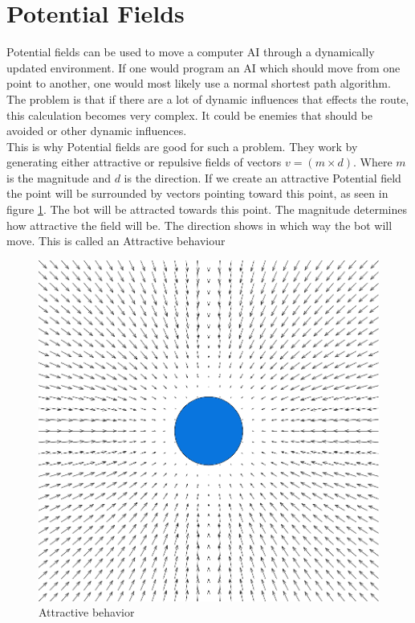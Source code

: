 \section{Potential Fields}
	Potential fields can be used to move a computer AI through a dynamically updated environment. 
	If one would program an AI which should move from one point to another, one would most likely use a normal shortest path algorithm. 
	The problem is that if there are a lot of dynamic influences that effects the route, this calculation becomes very complex. It could be 
	enemies that should be avoided or other dynamic influences. \\
	
	This is why Potential fields are good for such a problem. They work by generating either attractive or repulsive fields of vectors $v=(m \times d)$. 
	Where $m$ is the magnitude and $d$ is the direction. 
	If we create an attractive Potential field the point will be surrounded by vectors pointing toward this point, 
	as seen in figure \ref{fig:seekbehavior}. 
	The bot will be attracted towards this point. The magnitude determines how attractive the field will be. The direction shows in which way the bot will move. This is called an Attractive behaviour 
		
	\begin{figure}[H]
		\begin{center}
			\includegraphics[scale=0.3]{Figures/Potentialfields/seek.png}
			\caption{Attractive behavior\cite{pft}}\label{fig:seekbehavior}
		\end{center}
	\end{figure}
	
